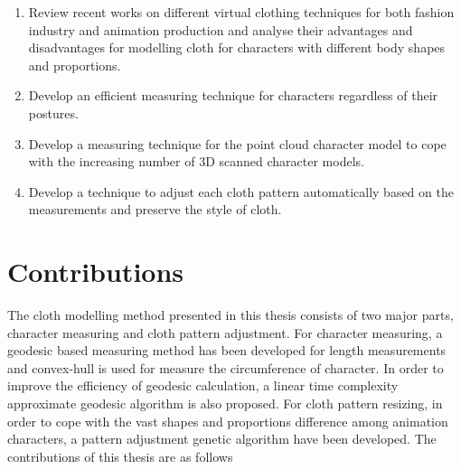 \begin{enumerate}
\item Review recent works on different virtual clothing techniques for both fashion industry and animation production and analyse their advantages and disadvantages for modelling cloth for characters with different body shapes and proportions. 

\item Develop an efficient measuring technique for characters regardless of their postures. 

\item Develop a measuring technique for the point cloud character model to cope with the increasing number of 3D scanned character models. 

\item Develop a technique to adjust each cloth pattern automatically based on the measurements and preserve the style of cloth.
\end{enumerate}

\section{Contributions}

The cloth modelling method presented in this thesis consists of two major parts, character measuring and cloth pattern adjustment. For character measuring, a geodesic based measuring method has been developed for length measurements and convex-hull is used for measure the circumference of character. In order to improve the efficiency of geodesic calculation, a linear time complexity approximate geodesic algorithm is also proposed. For cloth pattern resizing, in order to cope with the vast shapes and proportions difference among animation characters, a pattern adjustment genetic algorithm have been developed. The contributions of this thesis are as follows

